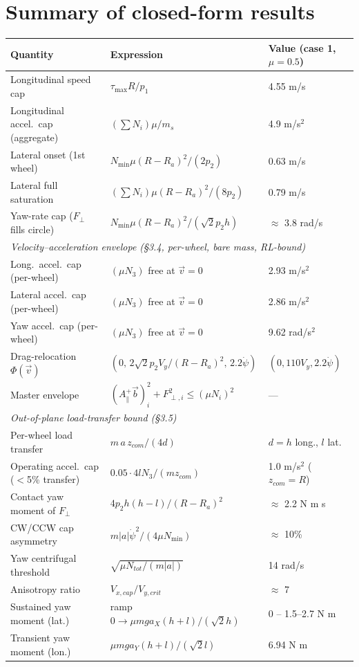 \documentclass[11pt]{article}
\begin{document}
\section{Summary of closed-form results}
\begin{table}[h]\centering\small
\begin{tabular}{lll}
\toprule
Quantity & Expression & Value (case 1, $\mu=0.5$)\\
\midrule
Longitudinal speed cap & $\tau_{\max}R/p_1$ & 4.55 m/s\\
Longitudinal accel.\ cap (aggregate) & $(\sum N_i)\mu/m_s$ & 4.9 m/s$^2$\\
Lateral onset (1st wheel) & $N_{\min}\mu(R-R_a)^2/(2p_2)$ & 0.63 m/s\\
Lateral full saturation & $(\sum N_i)\mu(R-R_a)^2/(8p_2)$ & 0.79 m/s\\
Yaw-rate cap ($F_\perp$ fills circle) & $N_{\min}\mu(R-R_a)^2/(\sqrt2 p_2h)$ & $\approx$ 3.8 rad/s\\
\midrule
\multicolumn{3}{l}{\emph{Velocity--acceleration envelope (\S3.4, per-wheel, bare mass, RL-bound)}}\\
Long.\ accel.\ cap (per-wheel) & $(\mu N_3)$ free at $\vec v=0$ & 2.93 m/s$^2$\\
Lateral accel.\ cap (per-wheel) & $(\mu N_3)$ free at $\vec v=0$ & 2.86 m/s$^2$\\
Yaw accel.\ cap (per-wheel) & $(\mu N_3)$ free at $\vec v=0$ & 9.62 rad/s$^2$\\
Drag-relocation $\Phi(\vec v)$ & $(0,\,2\sqrt2 p_2 V_y/(R\!-\!R_a)^2,\,2.2\dot\psi)$ & $(0,110V_y,2.2\dot\psi)$\\
Master envelope & $(A_\parallel^{+}\vec b)_i^2+F_{\perp,i}^2\le(\mu N_i)^2$ & ---\\
\midrule
\multicolumn{3}{l}{\emph{Out-of-plane load-transfer bound (\S3.5)}}\\
Per-wheel load transfer & $m\,a\,z_{com}/(4d)$ & $d=h$ long., $l$ lat.\\
Operating accel.\ cap ($<$5\% transfer) & $0.05\cdot4lN_3/(m z_{com})$ & 1.0 m/s$^2$ ($z_{com}\!=\!R$)\\
\midrule
Contact yaw moment of $F_\perp$ & $4p_2h(h-l)/(R-R_a)^2$ & $\approx$ 2.2 N m s\\
CW/CCW cap asymmetry & $m|a|\dot\psi^2/(4\mu N_{\min})$ & $\approx$ 10\%\\
Yaw centrifugal threshold & $\sqrt{\mu N_{tot}/(m|a|)}$ & 14 rad/s\\
Anisotropy ratio & $V_{x,cap}/V_{y,crit}$ & $\approx$ 7\\
Sustained yaw moment (lat.) & ramp $0\to\mu mg a_X(h+l)/(\sqrt2 h)$ & 0 -- 1.5--2.7 N m\\
Transient yaw moment (lon.) & $\mu mg a_Y(h+l)/(\sqrt2 l)$ & 6.94 N m\\
\bottomrule
\end{tabular}
\end{table}
\end{document}
